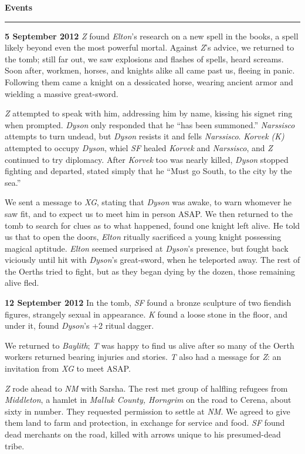 \documentclass[letterpaper]{article}
\newcommand{\e}[1]{\emph{#1}}
\newcommand{\B}[1]{\textbf{#1}}
\newenvironment{notesection}[1]
{ {\huge \B{#1}}\hrule\vspace{0.5em}\begingroup\fontsize{9pt}{12pt}\selectfont}
{\endgroup}
\begin{document}
\begin{notesection}{Events}
\B{5 September 2012} \e{Z} found \e{Elton}'s research on a new spell in the books, a spell likely beyond even the most powerful mortal. Against \e{Z}'s advice, we returned to the tomb; still far out, we saw explosions and flashes of spells, heard screams. Soon after, workmen, horses, and knights alike all came past us, fleeing in panic. Following them came a knight on a dessicated horse, wearing ancient armor and wielding a massive great-sword.

\e{Z} attempted to speak with him, addressing him by name, kissing his signet ring when prompted.  \e{Dyson} only responded that he ``has been summoned.'' \e{Narssisco} attempts to turn undead, but \e{Dyson} resists it and fells \e{Narssisco}. \e{Korvek (K)} attempted to occupy \e{Dyson}, whiel \e{SF} healed \e{Korvek} and \e{Narssisco}, and \e{Z} continued to try diplomacy. After \e{Korvek} too was nearly killed, \e{Dyson} stopped fighting and departed, stated simply that he ``Must go South, to the city by the sea.''

We sent a message to \e{XG}, stating that \e{Dyson} was awake, to warn whomever he saw fit, and to expect us to meet him in person ASAP. We then returned to the tomb to search for clues as to what happened, found one knight left alive. He told us that to open the doors, \e{Elton} ritually sacrificed a young knight possessing magical aptitude. \e{Elton} seemed surprised at \e{Dyson}'s presence, but fought back viciously until hit with \e{Dyson}'s great-sword, when he teleported away. The rest of the Oerths tried to fight, but as they began dying by the dozen, those remaining alive fled.

\B{12 September 2012} In the tomb, \e{SF} found a bronze sculpture of two fiendish figures, strangely sexual in appearance. \e{K} found a loose stone in the floor, and under it, found \e{Dyson}'s +2 ritual dagger.

We returned to \e{Baylith}; \e{T} was happy to find us alive after so many of the Oerth workers returned bearing injuries and stories. \e{T} also had a message for \e{Z}: an invitation from \e{XG} to meet ASAP.

\e{Z} rode ahead to \e{NM} with Sarsha. The rest met group of halfling refugees from \e{Middleton}, a hamlet in \e{Malluk County, Horngrim} on the road to Cerena, about sixty in number. They requested permission to settle at \e{NM}. We agreed to give them land to farm and protection, in exchange for service and food. \e{SF} found dead merchants on the road, killed with arrows unique to his presumed-dead tribe.


\end{notesection}
\end{document}
